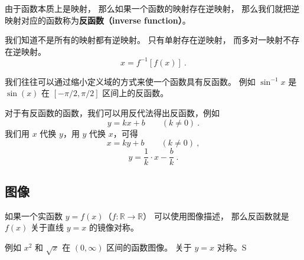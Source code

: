 
\begin{issues}
\issueDraft
\end{issues}

由于函数本质上是映射， 那么如果一个函数的映射存在逆映射， 那么我们就把逆映射对应的函数称为\textbf{反函数（inverse function）}。

我们知道不是所有的映射都有逆映射。 只有单射存在逆映射， 而多对一映射不存在逆映射。
\begin{equation}
x = f^{-1}[f(x)]~.
\end{equation}


我们往往可以通过缩小定义域的方式来使一个函数具有反函数。 例如 $\sin^{-1} x$ 是 $\sin(x)$ 在 $[-\pi/2, \pi/2]$ 区间上的反函数。

对于有反函数的函数，我们可以用反代法得出反函数，例如
\begin{equation}
y = kx + b \qquad (k \ne 0)~.
\end{equation}
我们用 $x$ 代换 $y$，用 $y$ 代换 $x$，可得
\begin{equation}
x = ky + b \qquad (k \ne 0)~,
\end{equation}
\begin{equation}
y = \frac{1}{k} \cdot x - \frac{b}{k}~.
\end{equation}

\subsection{图像}
如果一个实函数 $y = f(x)$（$f: \mathbb R \to \mathbb R$） 可以使用图像描述， 那么反函数就是 $f(x)$ 关于直线 $y = x$ 的镜像对称。

例如 $x^2$ 和 $\sqrt{x}$ 在 $(0, \infty)$ 区间的函数图像。 关于 $y = x$ 对称。S